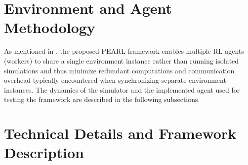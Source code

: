 

\section{Environment and Agent Methodology}
\label{sec:methodology}

As mentioned in , the proposed PEARL framework enables multiple RL agents (workers)
to share a single environment instance rather than running isolated simulations and thus
minimize redundant computations and communication overhead typically
encountered when synchronizing separate environment instances.
The dynamics of the simulator and the implemented agent used for testing the framework are described in the following subsections.




\section{Technical Details and Framework Description}
\label{sec:technical_details}



